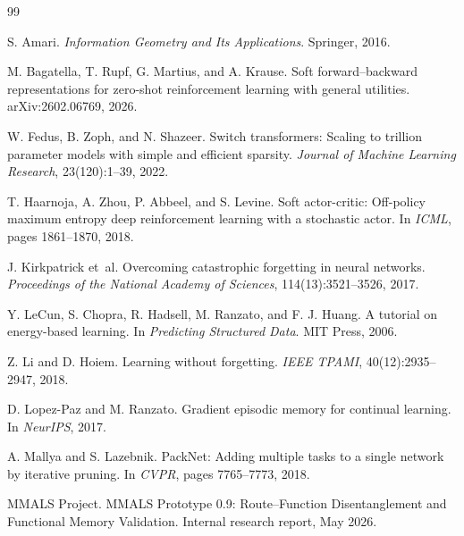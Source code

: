 \documentclass[10pt]{article}
\begin{document}
\begin{thebibliography}{99}

S. Amari.
\newblock \emph{Information Geometry and Its Applications}.
\newblock Springer, 2016.

M. Bagatella, T. Rupf, G. Martius, and A. Krause.
\newblock Soft forward--backward representations for zero-shot reinforcement learning with general utilities.
\newblock arXiv:2602.06769, 2026.

W. Fedus, B. Zoph, and N. Shazeer.
\newblock Switch transformers: Scaling to trillion parameter models with simple and efficient sparsity.
\newblock \emph{Journal of Machine Learning Research}, 23(120):1--39, 2022.

T. Haarnoja, A. Zhou, P. Abbeel, and S. Levine.
\newblock Soft actor-critic: Off-policy maximum entropy deep reinforcement learning with a stochastic actor.
\newblock In \emph{ICML}, pages 1861--1870, 2018.

J. Kirkpatrick et~al.
\newblock Overcoming catastrophic forgetting in neural networks.
\newblock \emph{Proceedings of the National Academy of Sciences}, 114(13):3521--3526, 2017.

Y. LeCun, S. Chopra, R. Hadsell, M. Ranzato, and F. J. Huang.
\newblock A tutorial on energy-based learning.
\newblock In \emph{Predicting Structured Data}. MIT Press, 2006.

Z. Li and D. Hoiem.
\newblock Learning without forgetting.
\newblock \emph{IEEE TPAMI}, 40(12):2935--2947, 2018.

D. Lopez-Paz and M. Ranzato.
\newblock Gradient episodic memory for continual learning.
\newblock In \emph{NeurIPS}, 2017.

A. Mallya and S. Lazebnik.
\newblock PackNet: Adding multiple tasks to a single network by iterative pruning.
\newblock In \emph{CVPR}, pages 7765--7773, 2018.

MMALS Project.
\newblock MMALS Prototype 0.9: Route--Function Disentanglement and Functional Memory Validation.
\newblock Internal research report, May 2026.


\end{thebibliography}
\end{document}
